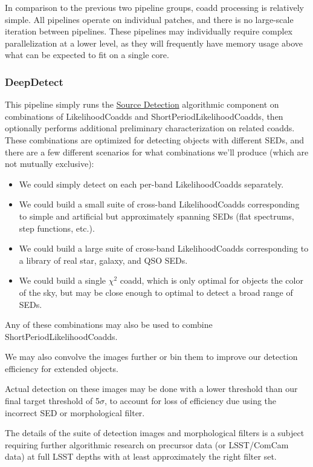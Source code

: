 In comparison to the previous two pipeline groups, coadd processing is relatively simple.  All pipelines operate on individual patches, and there is no large-scale iteration between pipelines.  These pipelines may individually require complex parallelization at a lower level, as they will frequently have memory usage above what can be expected to fit on a single core.

\subsubsection{DeepDetect}
\label{sec:drpDeepDetect}

This pipeline simply runs the \hyperref[sec:acSourceDetection]{Source Detection} algorithmic component on combinations of LikelihoodCoadds and ShortPeriodLikelihoodCoadds, then optionally performs additional preliminary characterization on related coadds.  These combinations are optimized for detecting objects with different SEDs, and there are a few different scenarios for what combinations we'll produce (which are not mutually exclusive):
\begin{itemize}
\item We could simply detect on each per-band LikelihoodCoadds separately.
\item We could build a small suite of cross-band LikelihoodCoadds corresponding to simple and artificial but approximately spanning SEDs (flat spectrums, step functions, etc.).
\item We could build a large suite of cross-band LikelihoodCoadds corresponding to a library of real star, galaxy, and QSO SEDs.
\item We could build a single $\chi^2$ coadd, which is only optimal for objects the color of the sky, but may be close enough to optimal to detect a broad range of SEDs.
\end{itemize}
Any of these combinations may also be used to combine ShortPeriodLikelihoodCoadds.

We may also convolve the images further or bin them to improve our detection efficiency for extended objects.

Actual detection on these images may be done with a lower threshold than our final target threshold of 5$\sigma$, to account for loss of efficiency due using the incorrect SED or morphological filter.

The details of the suite of detection images and morphological filters is a subject requiring further algorithmic research on precursor data (or LSST/ComCam data) at full LSST depths with at least approximately the right filter set.

